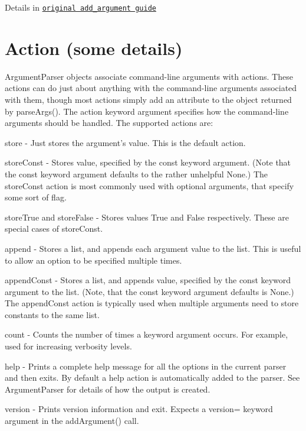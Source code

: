 Details in \href{http://docs.python.org/dev/library/argparse.html#the-add-argument-method}{\tt original add\+\_\+argument guide}

\section*{Action (some details) }

Argument\+Parser objects associate command-\/line arguments with actions. These actions can do just about anything with the command-\/line arguments associated with them, though most actions simply add an attribute to the object returned by parse\+Args(). The action keyword argument specifies how the command-\/line arguments should be handled. The supported actions are\+:


\begin{DoxyItemize}
\item {\ttfamily store} -\/ Just stores the argument’s value. This is the default action.
\item {\ttfamily store\+Const} -\/ Stores value, specified by the const keyword argument. (Note that the const keyword argument defaults to the rather unhelpful None.) The \textquotesingle{}store\+Const\textquotesingle{} action is most commonly used with optional arguments, that specify some sort of flag.
\item {\ttfamily store\+True} and {\ttfamily store\+False} -\/ Stores values True and False respectively. These are special cases of \textquotesingle{}store\+Const\textquotesingle{}.
\item {\ttfamily append} -\/ Stores a list, and appends each argument value to the list. This is useful to allow an option to be specified multiple times.
\item {\ttfamily append\+Const} -\/ Stores a list, and appends value, specified by the const keyword argument to the list. (Note, that the const keyword argument defaults is None.) The \textquotesingle{}append\+Const\textquotesingle{} action is typically used when multiple arguments need to store constants to the same list.
\item {\ttfamily count} -\/ Counts the number of times a keyword argument occurs. For example, used for increasing verbosity levels.
\item {\ttfamily help} -\/ Prints a complete help message for all the options in the current parser and then exits. By default a help action is automatically added to the parser. See Argument\+Parser for details of how the output is created.
\item {\ttfamily version} -\/ Prints version information and exit. Expects a {\ttfamily version=} keyword argument in the add\+Argument() call.
\end{DoxyItemize}

